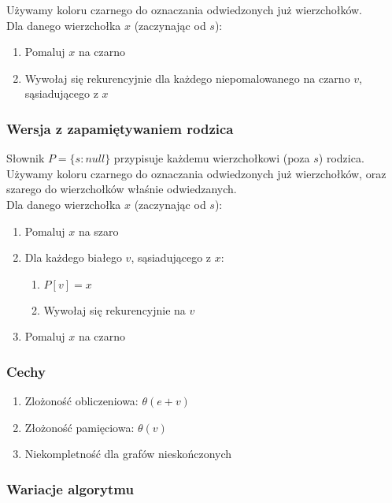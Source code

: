 \documentclass[main.tex]{subfiles}
\begin{document}
    Używamy koloru czarnego do oznaczania odwiedzonych już wierzchołków.\[\]
    Dla danego wierzchołka $x$ (zaczynając od $s$):
    \begin{enumerate}
        \item Pomaluj $x$ na czarno
        \item Wywołaj się rekurencyjnie dla każdego niepomalowanego na czarno $v$,
        sąsiadującego z $x$
    \end{enumerate}


    \subsubsection{Wersja z zapamiętywaniem rodzica}

    Słownik $P = \{s : null\}$ przypisuje każdemu wierzchołkowi (poza $s$) rodzica. Używamy
    koloru czarnego do oznaczania odwiedzonych już wierzchołków, oraz szarego do
    wierzchołków właśnie odwiedzanych.\[\]
    Dla danego wierzchołka $x$ (zaczynając od $s$):
    \begin{enumerate}
        \item Pomaluj $x$ na szaro
        \item Dla każdego białego $v$, sąsiadującego z $x$:
        \begin{enumerate}
            \item $P[v] = x$
            \item Wywołaj się rekurencyjnie na $v$
        \end{enumerate}
        \item Pomaluj $x$ na czarno
    \end{enumerate}

    \subsubsection{Cechy}

    \begin{enumerate}
        \item Zlożoność obliczeniowa: $\theta(e + v)$
        \item Złożoność pamięciowa: $\theta(v)$
        \item Niekompletność dla grafów nieskończonych
    \end{enumerate}

    \subsubsection{Wariacje algorytmu}
\end{document}
